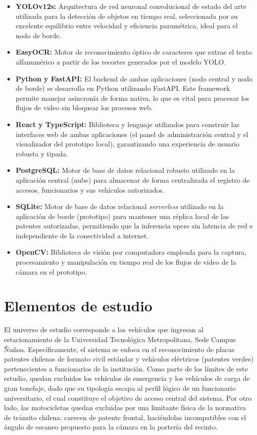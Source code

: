 \begin{itemize}
    \item \textbf{YOLOv12s:} Arquitectura de red neuronal convolucional de estado del arte utilizada para la detección de objetos en tiempo real, seleccionada por su excelente equilibrio entre velocidad y eficiencia paramétrica, ideal para el nodo de borde.
    \item \textbf{EasyOCR:} Motor de reconocimiento óptico de caracteres que extrae el texto alfanumérico a partir de los recortes generados por el modelo YOLO.
    \item \textbf{Python y FastAPI:} El backend de ambas aplicaciones (nodo central y nodo de borde) se desarrolla en Python utilizando FastAPI. Este framework permite manejar asincronía de forma nativa, lo que es vital para procesar los flujos de video sin bloquear los procesos web.
    \item \textbf{React y TypeScript:} Biblioteca y lenguaje utilizados para construir las interfaces web de ambas aplicaciones (el panel de administración central y el visualizador del prototipo local), garantizando una experiencia de usuario robusta y tipada.
    \item \textbf{PostgreSQL:} Motor de base de datos relacional robusto utilizado en la aplicación central (nube) para almacenar de forma centralizada el registro de accesos, funcionarios y sus vehículos autorizados.
    \item \textbf{SQLite:} Motor de base de datos relacional \textit{serverless} utilizado en la aplicación de borde (prototipo) para mantener una réplica local de las patentes autorizadas, permitiendo que la inferencia opere sin latencia de red e independiente de la conectividad a internet.
    \item \textbf{OpenCV:} Biblioteca de visión por computadora empleada para la captura, procesamiento y manipulación en tiempo real de los flujos de video de la cámara en el prototipo.
\end{itemize}

\section{Elementos de estudio}

El universo de estudio corresponde a los vehículos que ingresan al estacionamiento de la Universidad Tecnológica Metropolitana, Sede Campus Ñuñoa. Específicamente, el sistema se enfoca en el reconocimiento de placas patentes chilenas de formato civil estándar y vehículos eléctricos (patentes verdes) pertenecientes a funcionarios de la institución. 
Como parte de los límites de este estudio, quedan excluidos los vehículos de emergencia y los vehículos de carga de gran tonelaje, dado que su tipología escapa al perfil lógico de un funcionario universitario, el cual constituye el objetivo de acceso central del sistema. Por otro lado, las motocicletas quedan excluidas por una limitante física de la normativa de tránsito chilena: carecen de patente frontal, haciéndolas incompatibles con el ángulo de escaneo propuesto para la cámara en la portería del recinto.
